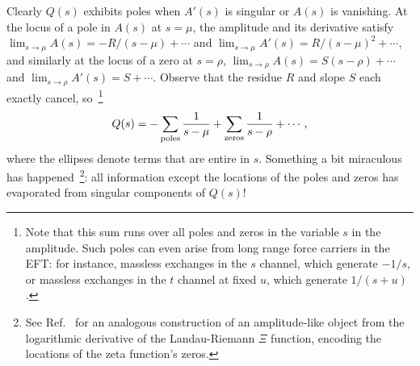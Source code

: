 \documentclass[twocolumn,english,aps,prd,reprint,floatfix,notitlepage,footinbib,preprintnumbers,superscriptaddress,longbibliography]{revtex4-1}
\newcommand{\be}{\begin{equation}}
\newcommand{\ee}{\end{equation}}
\newcommand{\eq}[2]{\be\begin{aligned}#1 \label{#2}\end{aligned}\ee}
\begin{document}
Clearly $Q(s)$ exhibits poles when $A'(s)$ is singular or $A(s)$ is vanishing.  At the locus of a pole in $A(s)$ at $s=\mu$, the amplitude and its derivative satisfy
$\lim_{s\rightarrow \mu} A(s)= -R/(s-\mu)+\cdots$
and $\lim_{s\rightarrow \mu} A'(s) = R/(s-\mu)^2 +\cdots$,
and similarly at the locus of a zero at $s=\rho$, $\lim_{s\rightarrow \rho} A(s) = S(s-\rho)+\cdots$ and $\lim_{s\rightarrow \rho} A'(s) = S+\cdots$.
Observe that the residue $R$ and slope $S$ each exactly cancel, so~\footnote{Note that this sum runs over all poles and zeros in the variable $s$ in the amplitude.  Such poles can even arise from long range force carriers in the EFT: for instance, massless exchanges in the $s$ channel, which generate $-1/s$, or massless exchanges in the $t$ channel at fixed $u$, which generate $1/(s+u)$. }
\eq{
Q(s) = -\sum_{\rm poles} \frac{1}{s-\mu}+\sum_{\rm zeros} \frac{1}{s-\rho} +\cdots,
}{Q_poles}
where the ellipses denote terms that are entire in $s$.  Something a bit miraculous has happened~\footnote{See Ref.~\cite{Remmen:2021zmc} for an analogous construction of an amplitude-like object from the logarithmic derivative of the Landau-Riemann $\Xi$ function, encoding the locations of the zeta function's zeros. }: all information except the locations of the poles and zeros has evaporated from singular components of $Q(s)$!
\end{document}
